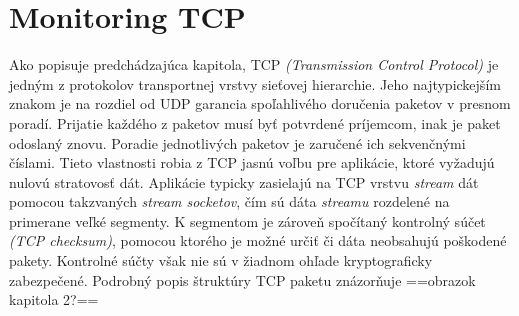 \documentclass[
  printed, %
  table,   %
  lof,     %
  lot,     %
]{fithesis3}
\begin{document}
\section{Monitoring TCP}
Ako popisuje predchádzajúca kapitola, TCP
\textit{(Transmission Control Protocol)} je jedným z protokolov transportnej
vrstvy sieťovej hierarchie. Jeho najtypickejším znakom je na rozdiel
od UDP garancia spoľahlivého doručenia paketov v presnom poradí. Prijatie
každého z paketov musí byť potvrdené príjemcom, inak je paket odoslaný znovu.
Poradie jednotlivých paketov je zaručené ich sekvenčnými číslami. Tieto 
vlastnosti robia z TCP jasnú voľbu pre aplikácie, ktoré vyžadujú nulovú
stratovosť dát. Aplikácie typicky zasielajú na TCP vrstvu \textit{stream} dát
pomocou takzvaných \textit{stream socketov}, čím sú dáta \textit{streamu}
rozdelené na primerane veľké segmenty. K segmentom je zároveň spočítaný
kontrolný súčet \textit{(TCP checksum)}, pomocou ktorého je možné určiť či
dáta neobsahujú poškodené pakety. Kontrolné súčty však nie sú v žiadnom ohľade
kryptograficky zabezpečené. Podrobný popis štruktúry TCP paketu znázorňuje
==obrazok kapitola 2?==
\end{document}
